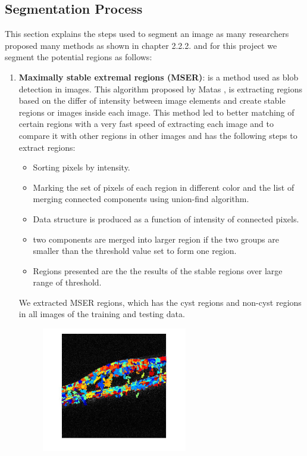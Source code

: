 \subsection{Segmentation Process}
This section explains the steps used to segment an image as many researchers proposed many methods as shown in chapter 2.2.2. and for this project we segment the potential regions as follows:
\begin{enumerate}
\item\textbf{Maximally stable extremal regions (MSER)}: is a method used as blob detection in images.
This algorithm proposed by Matas \cite{matas2004robust}, is extracting regions based on the differ of intensity between image elements and create stable regions or images inside each image.
This method led to better matching of certain regions with a very fast speed of extracting each image and to compare it with other regions in other images and has the following steps to extract regions:
\begin{itemize}
\item Sorting pixels by intensity.
\item Marking the set of pixels of each region in different color and the list of merging connected components using union-find algorithm.
\item Data structure is produced as a function of intensity of connected pixels.
\item two components are merged into larger region if the two groups are smaller than the threshold value set to form one region.
\item Regions presented are the the results of the stable regions over large range of threshold.
\end{itemize}
We extracted MSER regions, which has the cyst regions and non-cyst regions in all images of the training and testing data.
\begin{figure}[htb]
        \centering
        \includegraphics[width = 0.6\textwidth, height = 0.4\textheight]{figures/MSER.jpg} %

\end{figure}
\end{enumerate}
